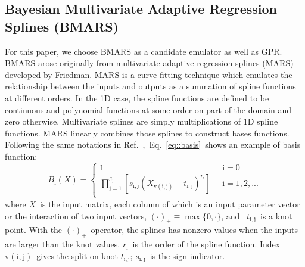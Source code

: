 \documentclass[review]{elsarticle}
\begin{document}



\subsection{Bayesian Multivariate Adaptive Regression Splines (BMARS)}
For this paper, we choose BMARS as a candidate emulator as well as GPR.  BMARS arose originally from multivariate adaptive regression splines (MARS) developed by Friedman\cite{friedman1991}. MARS is a curve-fitting technique which emulates the relationship between the inputs and outputs as a summation of spline functions at different orders\cite{stripbmars}. In the 1D case, the spline functions are defined to be continuous and polynomial functions at some order on part of the domain and zero otherwise. Multivariate splines are simply multiplications of 1D spline functions. MARS linearly combines those splines to construct bases functions. Following the same notations in Ref.~\cite{pie},~Eq.~\eqref{eq::basis}~shows an example of basis function:
\begin{equation}\label{eq::basis}
B_\mathrm{i}(X)=
\begin{cases}
1 & \mathrm{i}=0\\
\prod\limits_{\mathrm{j}=1}^{\mathrm{J_i}}\left[s_{\mathrm{i,j}}(X_{\mathrm{v(i,j)}}-t_{\mathrm{i,j}})^{r_\mathrm{i}}\right]_+ & \mathrm{i}=1,2,...
\end{cases}
\end{equation}
where $X$~is the input matrix, each column of which is an input parameter vector or the interaction of two input vectors,  $(\cdot)_+\equiv\max \{0,\cdot \}$, and ~$t_\mathrm{i,j}$~is a knot point. With the $(\cdot)_+$~operator, the splines has nonzero values when the inputs are larger than the knot values. $r_\mathrm{i}$~is the order of the spline function. Index $\mathrm{v(i,j)}$~gives the split on knot $t_{\mathrm{i,j}}$; $s_{\mathrm{i,j}}$~is the sign indicator.
\end{document}
